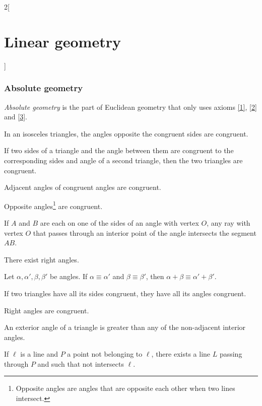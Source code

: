 \documentclass[class=article,10pt,crop=false]{standalone}
\begin{document}
\begin{multicols}{2}[\section{Linear geometry}]
\subsubsection{Absolute geometry}
\begin{definition}
\textit{Absolute geometry} is the part of Euclidean geometry that only uses axioms \ref{1}, \ref{2} and \ref{3}.
\end{definition}
\begin{theorem}
In an isosceles triangles, the angles opposite the congruent sides are congruent.
\end{theorem}
\begin{theorem}
If two sides of a triangle and the angle between them are congruent to the corresponding sides and angle of a second triangle, then the two triangles are congruent.
\end{theorem}
\begin{theorem}
Adjacent angles of congruent angles are congruent.
\end{theorem}
\begin{theorem}
Opposite angles\footnote{Opposite angles are angles that are opposite each other when two lines intersect.} are congruent.
\end{theorem}
\begin{theorem}
If $A$ and $B$ are each on one of the sides of an angle with vertex $O$, any ray with vertex $O$ that passes through an interior point of the angle intersects the segment $AB$.
\end{theorem}
\begin{theorem}
There exist right angles.
\end{theorem}
\begin{theorem}
Let $\alpha,\alpha',\beta,\beta'$ be angles. If $\alpha\equiv\alpha'$ and $\beta\equiv\beta'$, then $\alpha+\beta\equiv\alpha'+\beta'$.
\end{theorem}
\begin{theorem}
If two triangles have all its sides congruent, they have all its angles congruent.
\end{theorem}
\begin{theorem}
Right angles are congruent.
\end{theorem}
\begin{theorem}
An exterior angle of a triangle is greater than any of the non-adjacent interior angles.
\end{theorem}
\begin{theorem}
If $\ell$ is a line and $P$ a point not belonging to $\ell$, there exists a line $L$ passing through $P$ and such that not intersects $\ell$.

\end{theorem}
\end{multicols}
\end{document}

